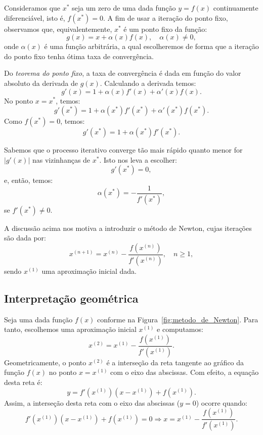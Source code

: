 Consideramos que $x^*$ seja um zero de uma dada função $y = f(x)$ continuamente diferenciável, isto é, $f(x^*) = 0$. A fim de usar a iteração do ponto fixo, observamos que, equivalentemente, $x^*$ é um ponto fixo da função:
\begin{equation}
  g(x)= x + \alpha(x)f(x),\quad\alpha(x)\neq 0,
\end{equation}
onde $\alpha(x)$ é uma função arbitrária, a qual escolheremos de forma que a iteração do ponto fixo tenha ótima taxa de convergência.

Do \emph{teorema do ponto fixo}, a taxa de convergência é dada em função do valor absoluto da derivada de $g(x)$. Calculando a derivada temos:
\begin{equation}
  g'(x)=1+\alpha(x)f'(x)+\alpha'(x)f(x).
\end{equation}
No ponto $x = x^*$, temos:
\begin{equation}
  g'(x^*) = 1 + \alpha(x^*)f'(x^*) + \alpha'(x^*)f(x^*).
\end{equation}
Como $f(x^*)=0$, temos:
\begin{equation}
  g'(x^*) = 1 + \alpha(x^*)f'(x^*).
\end{equation}

Sabemos que o processo iterativo converge tão mais rápido quanto menor for $|g'(x)|$ nas vizinhanças de $x^*$. Isto nos leva a escolher:
\begin{equation}
  g'(x^*) = 0,
\end{equation}
e, então, temos:
\begin{equation}
  \alpha(x^*) = -\frac{1}{f'(x^*)},
\end{equation}
se $f'(x^*)\neq 0$.

A discussão acima nos motiva a introduzir o método de Newton, cujas iterações são dada por:
\begin{equation}
  x^{(n+1)} = x^{(n)} - \frac{f\left(x^{(n)}\right)}{f'\left(x^{(n)}\right)}, \quad n\geq 1,
\end{equation}
sendo $x^{(1)}$ uma aproximação inicial dada.

\subsection{Interpretação geométrica}

Seja uma dada função $f(x)$  conforme na Figura~\ref{fig:metodo_de_Newton}. Para tanto, escolhemos uma aproximação inicial $x^{(1)}$ e computamos:
\begin{equation}
  x^{(2)} = x^{(1)} - \frac{f(x^{(1)})}{f'(x^{(1)})}.
\end{equation}
Geometricamente, o ponto $x^{(2)}$ é a interseção da reta tangente ao gráfico da função $f(x)$ no ponto $x = x^{(1)}$ com o eixo das abscissas. Com efeito, a equação desta reta é:
\begin{equation}
  y = f'(x^{(1)})(x - x^{(1)}) + f(x^{(1)}).
\end{equation}
Assim, a interseção desta reta com o eixo das abscissas ($y=0$) ocorre quando:
\begin{equation}
  f'(x^{(1)})(x - x^{(1)}) + f(x^{(1)}) = 0\Rightarrow x = x^{(1)} - \frac{f(x^{(1)})}{f'(x^{(1)})}.
\end{equation}

